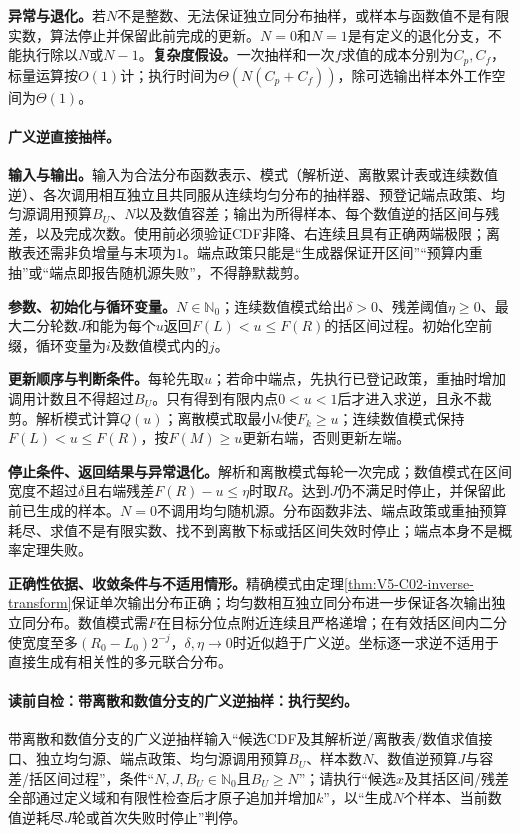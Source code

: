 \textbf{异常与退化。}若$N$不是整数、无法保证独立同分布抽样，或样本与函数值不是有限实数，算法停止并保留此前完成的更新。$N=0$和$N=1$是有定义的退化分支，不能执行除以$N$或$N-1$。\textbf{复杂度假设。}一次抽样和一次$f$求值的成本分别为$C_p,C_f$，标量运算按$O(1)$计；执行时间为$\Theta(N(C_p+C_f))$，除可选输出样本外工作空间为$\Theta(1)$。

\paragraph{广义逆直接抽样。}
\textbf{输入与输出。}输入为合法分布函数表示、模式（解析逆、离散累计表或连续数值逆）、各次调用相互独立且共同服从连续均匀分布的抽样器、预登记端点政策、均匀源调用预算$B_U$、$N$以及数值容差；输出为所得样本、每个数值逆的括区间与残差，以及完成次数。使用前必须验证CDF非降、右连续且具有正确两端极限；离散表还需非负增量与末项为$1$。端点政策只能是“生成器保证开区间”“预算内重抽”或“端点即报告随机源失败”，不得静默裁剪。

\textbf{参数、初始化与循环变量。}$N\in\mathbb N_0$；连续数值模式给出$\delta>0$、残差阈值$\eta\ge0$、最大二分轮数$J$和能为每个$u$返回$F(L)<u\le F(R)$的括区间过程。初始化空前缀，循环变量为$i$及数值模式内的$j$。

\textbf{更新顺序与判断条件。}每轮先取$u$；若命中端点，先执行已登记政策，重抽时增加调用计数且不得超过$B_U$。只有得到有限内点$0<u<1$后才进入求逆，且永不裁剪。解析模式计算$Q(u)$；离散模式取最小$k$使$F_k\ge u$；连续数值模式保持$F(L)<u\le F(R)$，按$F(M)\ge u$更新右端，否则更新左端。

\textbf{停止条件、返回结果与异常退化。}解析和离散模式每轮一次完成；数值模式在区间宽度不超过$\delta$且右端残差$F(R)-u\le\eta$时取$R$。达到$J$仍不满足时停止，并保留此前已生成的样本。$N=0$不调用均匀随机源。分布函数非法、端点政策或重抽预算耗尽、求值不是有限实数、找不到离散下标或括区间失效时停止；端点本身不是概率定理失败。

\textbf{正确性依据、收敛条件与不适用情形。}精确模式由定理\ref{thm:V5-C02-inverse-transform}保证单次输出分布正确；均匀数相互独立同分布进一步保证各次输出独立同分布。数值模式需$F$在目标分位点附近连续且严格递增；在有效括区间内二分使宽度至多$(R_0-L_0)2^{-j}$，$\delta,\eta\to0$时近似趋于广义逆。坐标逐一求逆不适用于直接生成有相关性的多元联合分布。

\begingroup
{}
\paragraph{读前自检：带离散和数值分支的广义逆抽样：执行契约。}带离散和数值分支的广义逆抽样输入“候选CDF及其解析逆/离散表/数值求值接口、独立均匀源、端点政策、均匀源调用预算$B_U$、样本数$N$、数值逆预算$J$与容差/括区间过程”，条件“$N,J,B_U\in\mathbb N_0$且$B_U\ge N$”；请执行“候选$x$及其括区间/残差全部通过定义域和有限性检查后才原子追加并增加$k$”，以“生成$N$个样本、当前数值逆耗尽$J$轮或首次失败时停止”判停。\par

